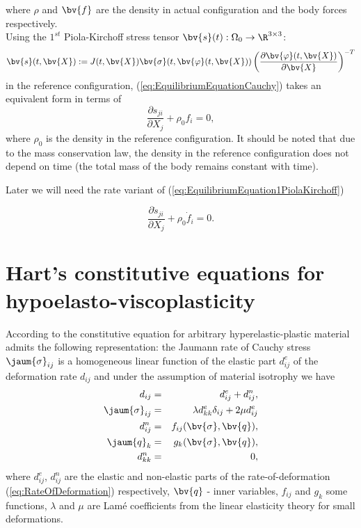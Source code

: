 where $\rho$ and $\bv{f}$ are the density in actual configuration and the body forces respectively.\\
Using the ${1}^{st}$ Piola-Kirchoff stress tensor $\bv{s}(t):\Omega_0\rightarrow \R^{3\times 3}$:
\begin{equation}
\bv{s}(t,\bv{X}):=J(t,\bv{X})\bv{\sigma}(t,\bv{\varphi}(t,\bv{X}))\left(\frac{\partial \bv{\varphi}(t,\bv{X})}{\partial \bv{X}}\right)^{-T} 
\end{equation}
in the reference configuration, (\ref{eq:EquilibriumEquationCauchy}) takes an equivalent  form in terms of
\begin{equation}\label{eq:EquilibriumEquation1PiolaKirchoff}
\frac{\partial s_{ji}}{\partial X_j} +\rho_0 f_i=0,
\end{equation}
where $\rho_0$ is the density in the reference configuration. It should be noted that due to the mass conservation law, the density in the reference configuration does not depend on time (the total mass of the body remains constant with time).

Later we will need the rate variant of (\ref{eq:EquilibriumEquation1PiolaKirchoff})

\begin{equation}\label{eq:EquilibriumRateEquation1PiolaKirchoff}
 \frac{\partial \dot{s}_{ji}}{\partial X_j} +\rho_0 \dot{f}_i=0.
\end{equation}


\section{Hart's constitutive equations for hypoelasto-viscoplasticity}\label{sec:HartConstitutiveLaw}
According to \cite{Belytschko2000} the constitutive equation for arbitrary hyperelastic-plastic material admits the following representation: the Jaumann rate of Cauchy stress $\jaum{\sigma}_{ij}$ is a homogeneous linear function of the elastic  part $d^{e}_{ij}$ of the deformation rate $d_{ij}$ and under the assumption of material isotrophy we have
\begin{eqnarray}
d_{ij}&=&d^e_{ij}+d^n_{ij}, \label{eq:RateOfDeformationAdditiveDecomposition}\\
\jaum{\sigma}_{ij}&=& \lambda d^{e}_{kk} \delta_{ij}+2\mu d^{e}_{ij} \\
d^{n}_{ij}&=&f_{ij}(\bv{\sigma},\bv{q}), \label{eq:CauchyJaumannDerivativeHookLaw} \\
\jaum{q}_k&=&g_k(\bv{\sigma},\bv{q}), \\
 d^{n}_{kk}&=& 0, \label{eq:NonElasticDeformationRateIncompressibility}
\end{eqnarray}
where $d^e_{ij}$, $d^n_{ij}$ are  the elastic and non-elastic parts of the rate-of-deformation (\ref{eq:RateOfDeformation}) respectively,  $\bv{q}$ - inner variables, $f_{ij}$ and $g_k$ some functions, $\lambda$ and $\mu$ are Lam\'e coefficients from the linear elasticity theory for small deformations.

